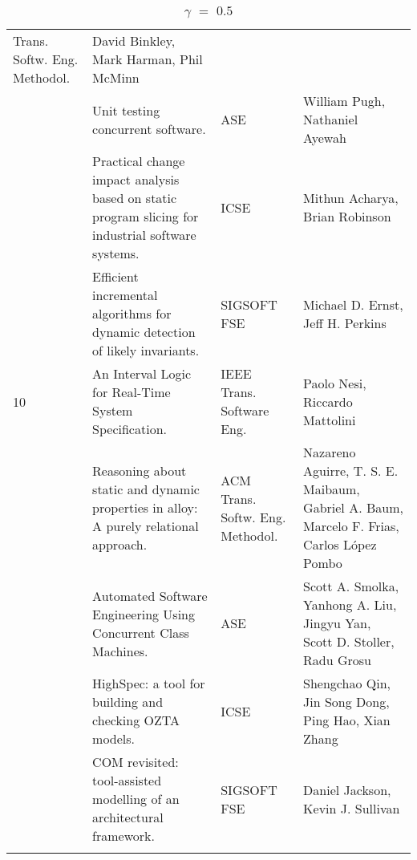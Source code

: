 \begin{center}
\begin{longtable}{|p{}p{}p{}p{}|}
Trans. Softw. Eng. Methodol.& David Binkley, Mark Harman, Phil McMinn \\
\rowcolor{black!20} & Unit testing concurrent software.& ASE& William Pugh, Nathaniel Ayewah \\
 & Practical change impact analysis based on static program slicing for industrial software 
systems.& ICSE& Mithun Acharya, Brian Robinson \\
\rowcolor{black!20} & Efficient incremental algorithms for dynamic detection of likely invariants.& 
SIGSOFT FSE& Michael D. Ernst, Jeff H. Perkins \\
10 & An Interval Logic for Real-Time System Specification.& IEEE Trans. Software Eng.& Paolo Nesi, 
Riccardo Mattolini \\
\rowcolor{black!20} & Reasoning about static and dynamic properties in alloy: A purely relational 
approach.& ACM Trans. Softw. Eng. Methodol.& Nazareno Aguirre, T. S. E. Maibaum, Gabriel A. Baum, 
Marcelo F. Frias, Carlos López Pombo \\
 & Automated Software Engineering Using Concurrent Class Machines.& ASE& Scott A. Smolka, Yanhong A. 
Liu, Jingyu Yan, Scott D. Stoller, Radu Grosu \\
\rowcolor{black!20} & HighSpec: a tool for building and checking OZTA models.& ICSE& Shengchao Qin, 
Jin Song Dong, Ping Hao, Xian Zhang \\
 & COM revisited: tool-assisted modelling of an architectural framework.& SIGSOFT FSE& Daniel 
Jackson, Kevin J. Sullivan \\
    \hline
    \caption {$\gamma$ $=$ $0.5$}
\end{longtable}
\end{center}